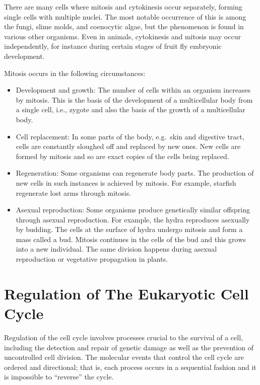 There are many cells where mitosis and cytokinesis occur separately, forming single cells with multiple nuclei. The most notable occurrence of this is among the fungi, slime molds, and coenocytic algae, but the phenomenon is found in various other organisms. Even in animals, cytokinesis and mitosis may occur independently, for instance during certain stages of fruit fly embryonic development.

Mitosis occurs in the following circumstances:

\begin{itemize}
\tightlist
\item
  Development and growth: The number of cells within an organism increases by mitosis. This is the basis of the development of a multicellular body from a single cell, i.e., zygote and also the basis of the growth of a multicellular body.
\item
  Cell replacement: In some parts of the body, e.g.~skin and digestive tract, cells are constantly sloughed off and replaced by new ones. New cells are formed by mitosis and so are exact copies of the cells being replaced.
\item
  Regeneration: Some organisms can regenerate body parts. The production of new cells in such instances is achieved by mitosis. For example, starfish regenerate lost arms through mitosis.
\item
  Asexual reproduction: Some organisms produce genetically similar offspring through asexual reproduction. For example, the hydra reproduces asexually by budding. The cells at the surface of hydra undergo mitosis and form a mass called a bud. Mitosis continues in the cells of the bud and this grows into a new individual. The same division happens during asexual reproduction or vegetative propagation in plants.
\end{itemize}

\hypertarget{regulation-of-the-eukaryotic-cell-cycle}{%
\section{Regulation of The Eukaryotic Cell Cycle}\label{regulation-of-the-eukaryotic-cell-cycle}}

Regulation of the cell cycle involves processes crucial to the survival of a cell, including the detection and repair of genetic damage as well as the prevention of uncontrolled cell division. The molecular events that control the cell cycle are ordered and directional; that is, each process occurs in a sequential fashion and it is impossible to ``reverse'' the cycle.

